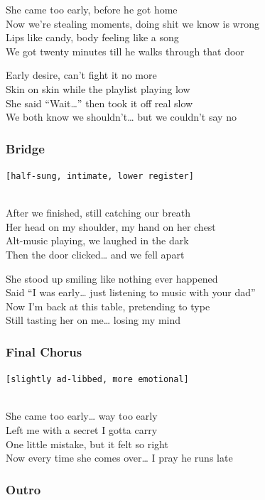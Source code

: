 She came too early, before he got home\\
Now we're stealing moments, doing shit we know is wrong\\
Lips like candy, body feeling like a song\\
We got twenty minutes till he walks through that door

Early desire, can't fight it no more\\
Skin on skin while the playlist playing low\\
She said ``Wait\ldots'' then took it off real slow\\
We both know we shouldn't\ldots{} but we couldn't say no

\subsubsection{Bridge}\label{bridge-32}

\texttt{{[}half-sung,\ intimate,\ lower\ register{]}}\strut \\
After we finished, still catching our breath\\
Her head on my shoulder, my hand on her chest\\
Alt-music playing, we laughed in the dark\\
Then the door clicked\ldots{} and we fell apart

She stood up smiling like nothing ever happened\\
Said ``I was early\ldots{} just listening to music with your dad''\\
Now I'm back at this table, pretending to type\\
Still tasting her on me\ldots{} losing my mind

\subsubsection{Final Chorus}\label{final-chorus-9}

\texttt{{[}slightly\ ad-libbed,\ more\ emotional{]}}\strut \\
She came too early\ldots{} way too early\\
Left me with a secret I gotta carry\\
One little mistake, but it felt so right\\
Now every time she comes over\ldots{} I pray he runs late

\subsubsection{Outro}\label{outro-9}


